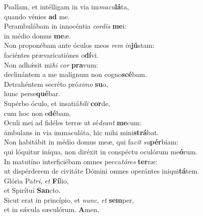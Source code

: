 \evenverse Psallam, et intélligam in via im\textit{ma}\textit{cu}\textbf{lá}ta,~\*\\
\evenverse quando vénies \textbf{ad} me.\\
\oddverse Perambulábam in innocéntia \textit{cor}\textit{dis} \textbf{me}i:~\*\\
\oddverse in médio domus \textbf{me}æ.\\
\evenverse Non proponébam ante óculos meos \textit{rem} \textit{in}\textbf{jú}stam:~\*\\
\evenverse faciéntes prævaricatiónes o\textbf{dí}vi.\\
\oddverse Non adhǽsit mi\textit{hi} \textit{cor} \textbf{pra}vum:~\*\\
\oddverse declinántem a me malígnum non cogno\textbf{scé}bam.\\
\evenverse Detrahéntem secréto pró\textit{xi}\textit{mo} \textbf{su}o,~\*\\
\evenverse hunc perse\textbf{qué}bar.\\
\oddverse Supérbo óculo, et insatiá\textit{bi}\textit{li} \textbf{cor}de,~\*\\
\oddverse cum hoc non e\textbf{dé}bam.\\
\evenverse Oculi mei ad fidéles terræ ut sé\textit{de}\textit{ant} \textbf{me}cum:~\*\\
\evenverse ámbulans in via immaculáta, hic mihi mini\textbf{strá}bat.\\
\oddverse Non habitábit in médio domus meæ, qui fa\textit{cit} \textit{su}\textbf{pér}biam:~\*\\
\oddverse qui lóquitur iníqua, non diréxit in conspéctu oculórum me\textbf{ó}rum.\\
\evenverse In matutíno interficiébam omnes pecca\textit{tó}\textit{res} \textbf{ter}ræ:~\*\\
\evenverse ut dispérderem de civitáte Dómini omnes operántes iniqui\textbf{tá}tem.\\
\oddverse Glória Pa\textit{tri}, \textit{et} \textbf{Fí}lio,~\*\\
\oddverse et Spirítui \textbf{San}cto.\\
\evenverse Sicut erat in princípio, et \textit{nunc}, \textit{et} \textbf{sem}per,~\*\\
\evenverse et in sǽcula sæculórum. \textbf{A}men.\\
